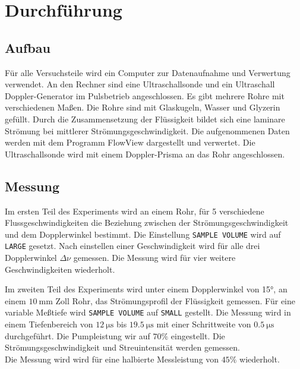 \section{Durchführung}
\label{sec:Durchführung}

\subsection{Aufbau}

Für alle Versuchsteile wird ein Computer zur Datenaufnahme und Verwertung verwendet.
An den Rechner sind eine Ultraschallsonde und ein Ultraschall Doppler-Generator im Pulsbetrieb angeschlossen.
Es gibt mehrere Rohre mit verschiedenen Maßen. Die Rohre sind mit Glaskugeln, Wasser und Glyzerin gefüllt.
Durch die Zusammensetzung der Flüssigkeit bildet sich eine laminare Strömung bei mittlerer Strömungsgeschwindigkeit.
Die aufgenommenen Daten werden mit dem Programm FlowView dargestellt und verwertet. 
Die Ultraschallsonde wird mit einem Doppler-Prisma an das Rohr angeschlossen.

\subsection{Messung}

Im ersten Teil des Experiments wird an einem Rohr, für 5 verschiedene Flussgeschwindigkeiten die Beziehung zwischen 
der Strömungsgeschwindigkeit und dem Dopplerwinkel bestimmt. Die Einstellung \texttt{SAMPLE VOLUME} wird auf \texttt{LARGE} gesetzt.
Nach einstellen einer Geschwindigkeit wird für alle drei Dopplerwinkel $Δν$ gemessen. Die Messung wird für vier weitere Geschwindigkeiten wiederholt.

Im zweiten Teil des Experiments wird unter einem Dopplerwinkel von 15°, an einem $\SI{10}{\milli\meter}$ Zoll Rohr, das Strömungsprofil der 
Flüssigkeit gemessen. Für eine variable Meßtiefe wird \texttt{SAMPLE VOLUME} auf \texttt{SMALL} gestellt.
Die Messung wird in einem Tiefenbereich von $\SI{12}{\micro\second}$ bis $\SI{19.5}{\micro\second}$ %
mit einer Schrittweite von $\SI{0.5}{\micro\second}$ durchgeführt. Die Pumpleistung wir auf $70\%$ eingestellt.
Die Strömungsgeschwindigkeit und Streuintensität werden gemessen.\\
Die Messung wird wird für eine halbierte Messleistung von $45\%$ wiederholt.\\